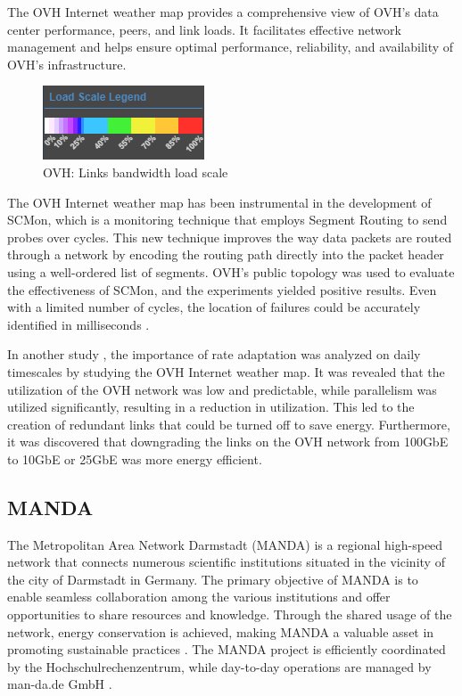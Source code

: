 \documentclass[sigconf,authorversion,nonacm]{acmart}
\begin{document}
The OVH Internet weather map provides a comprehensive view of OVH's data center performance, peers, and link loads. It facilitates effective network management and helps ensure optimal performance, reliability, and availability of OVH's infrastructure.

\begin{figure}
    \centering
    \includegraphics{OVH/scale.png}
    \caption{OVH: Links bandwidth load scale}
    \label{OVH: Links bandwidth load scale}
\end{figure}

The OVH Internet weather map has been instrumental in the development of SCMon, which is a monitoring technique that employs Segment Routing to send probes over cycles. This new technique improves the way data packets are routed through a network by encoding the routing path directly into the packet header using a well-ordered list of segments. OVH's public topology was used to evaluate the effectiveness of SCMon, and the experiments yielded positive results. Even with a limited number of cycles, the location of failures could be accurately identified in milliseconds \cite{7524410}.

In another study \cite{10.1145/3604930.3605713}, the importance of rate adaptation was analyzed on daily timescales by studying the OVH Internet weather map. It was revealed that the utilization of the OVH network was low and predictable, while parallelism was utilized significantly, resulting in a reduction in utilization. This led to the creation of redundant links that could be turned off to save energy. Furthermore, it was discovered that downgrading the links on the OVH network from 100GbE to 10GbE or 25GbE was more energy efficient.

\subsection{MANDA}
The Metropolitan Area Network Darmstadt (MANDA) is a regional high-speed network that connects numerous scientific institutions situated in the vicinity of the city of Darmstadt in Germany. The primary objective of MANDA is to enable seamless collaboration among the various institutions and offer opportunities to share resources and knowledge. Through the shared usage of the network, energy conservation is achieved, making MANDA a valuable asset in promoting sustainable practices \cite{manda1}. The MANDA project is efficiently coordinated by the Hochschulrechenzentrum, while day-to-day operations are managed by man-da.de GmbH \cite{manda2}. 
\end{document}
